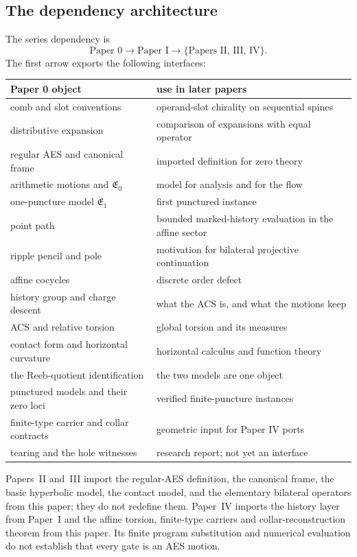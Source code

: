 \subsection{The dependency architecture}

The series dependency is
\[
  \boxed{
  \text{Paper 0}
  \longrightarrow
  \text{Paper I}
  \longrightarrow
  \{\text{Papers II, III, IV}\}.
  }
\]
The first arrow exports the following interfaces:

\begin{center}
\renewcommand{\arraystretch}{1.3}
\begin{tabular}{ll}
\toprule
Paper 0 object & use in later papers \\
\midrule
comb and slot conventions & operand-slot chirality on sequential spines \\
distributive expansion & comparison of expansions with equal operator \\
regular AES and canonical frame & imported definition for zero theory \\
arithmetic motions and $\mathfrak E_0$ & model for analysis and for the flow \\
one-puncture model $\mathfrak E_1$ & first punctured instance \\
point path & bounded marked-history evaluation in the affine sector \\
ripple pencil and pole & motivation for bilateral projective continuation \\
affine cocycles & discrete order defect \\
history group and charge descent & what the ACS is, and what the motions keep \\
ACS and relative torsion & global torsion and its measures \\
contact form and horizontal curvature & horizontal calculus and function theory \\
the Reeb-quotient identification & the two models are one object \\
punctured models and their zero loci & verified finite-puncture instances \\
finite-type carrier and collar contracts & geometric input for Paper IV ports\\
tearing and the hole witnesses & research report; not yet an interface \\
\bottomrule
\end{tabular}
\end{center}

Papers~II and~III import the regular-AES definition, the canonical frame, the
basic hyperbolic model, the contact model, and the elementary bilateral
operators from this paper; they do not redefine them.  Paper~IV imports the
history layer from Paper~I and the affine torsion, finite-type carriers and
collar-reconstruction theorem from this paper.  Its finite program substitution
and numerical evaluation do not establish that every gate is an AES motion.


